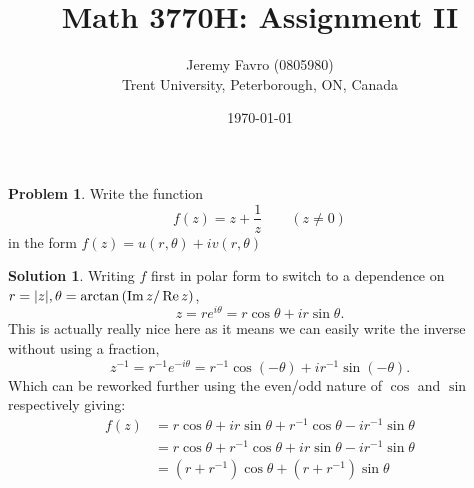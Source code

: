 \documentclass[10pt]{article}
\title{Math 3770H: Assignment II}
\author{Jeremy Favro (0805980) \\ Trent University, Peterborough, ON, Canada}
\date{\today}
\theoremstyle{definition}
\newtheorem{problem}{Problem}
\newtheorem{soln}{Solution}
\begin{document}
\maketitle

\begin{problem}
Write the function
$$f(z)=z+\frac{1}{z}\qquad(z\neq 0)$$
in the form $f(z)=u(r,\theta)+iv(r,\theta)$
\end{problem}
\begin{soln}
  Writing $f$ first in polar form to switch to a dependence on $r=\abs{z},\theta=\arctan\left(\Im z/\Re z\right)$,
  $$z=re^{i\theta}=r\cos\theta+ir\sin\theta.$$
  This is actually really nice here as it means we can easily write the inverse without using a fraction,
  $$z^{-1}=r^{-1}e^{-i\theta}=r^{-1}\cos\left(-\theta\right)+ir^{-1}\sin\left(-\theta\right).$$
  Which can be reworked further using the even/odd nature of $\cos$ and $\sin$ respectively giving:
  \begin{align*}
    f(z) & =r\cos\theta+ir\sin\theta + r^{-1}\cos\theta-ir^{-1}\sin\theta      \\
         & =r\cos\theta+r^{-1}\cos\theta + ir\sin\theta -ir^{-1}\sin\theta     \\
         & =\left(r+r^{-1}\right)\cos\theta +  \left(r+r^{-1}\right)\sin\theta
  \end{align*}
\end{soln}
\newpage
\end{document}
